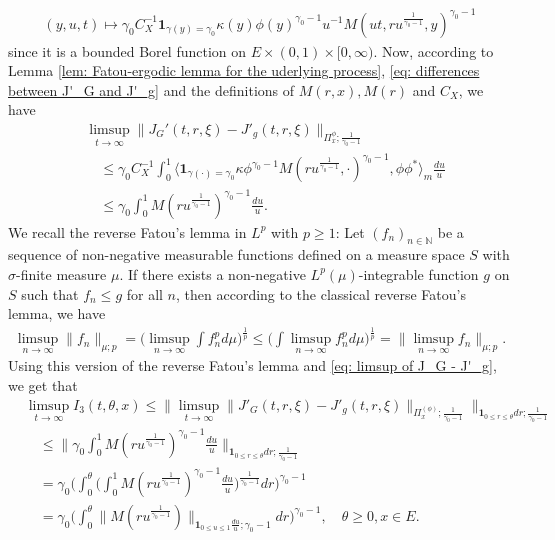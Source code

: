 \documentclass[12pt,a4paper]{amsart}
\theoremstyle{definition}
\numberwithin{equation}{section}
\begin{document}
\begin{align}
	(y,u,t)
	\mapsto \gamma_0 C_X^{-1}\mathbf 1_{\gamma(y) = \gamma_0} \kappa(y)  \phi(y)^{\gamma_0 - 1}  u^{-1} M(ut,ru^{\frac{1}{\gamma_0 - 1}},y)^{\gamma_0 - 1}
\end{align}
since it is a bounded Borel function on $E\times (0,1) \times [0,\infty)$.
Now, according to Lemma \ref{lem: Fatou-ergodic lemma for the uderlying process}, \eqref{eq: differences between J'_G and J'_g} and the definitions of $M(r,x), M(r)$ and $C_X$, we have
\begin{align}\label{eq: limsup of J_G - J'_g}
	&\limsup_{t\to \infty} \| J_G'(t,r,\xi) - J'_g(t,r,\xi) \|_{\Pi_x^{\phi};\frac{1}{\gamma_0 - 1}}
	\\& \quad \leq  \gamma_0 C_X^{-1} \int_0^1 \big\langle \mathbf 1_{\gamma(\cdot) = \gamma_0} \kappa \phi^{\gamma_0 - 1} M(ru^{\frac{1}{\gamma_0 - 1}},\cdot)^{\gamma_0 - 1}, \phi\phi^* \big\rangle_m \frac{du}{u}
	\\& \quad \leq  \gamma_0  \int_0^1  M(ru^{\frac{1}{\gamma_0 - 1}})^{\gamma_0 - 1} \frac{du}{u}.
\end{align}
We recall the reverse Fatou's lemma in $L^p$ with $p\geq 1$: Let $(f_n)_{n\in \mathbb N}$ be a sequence of non-negative measurable functions defined on a measure space $S$ with $\sigma$-finite measure $\mu$. If there exists a non-negative $L^p(\mu)$-integrable function $g$ on $S$ such that $f_n \leq g$ for all $n$, then according to the classical reverse Fatou's lemma, we have
\begin{align}
	\limsup_{n\to \infty}\big\| f_n \big\|_{\mu;p}
	= \Big (   \limsup_{n\to \infty}  \int f^p_n d\mu        \Big)^{\frac{1}{p}}
	\leq  \Big (   \int \limsup_{n\to \infty} f^p_n d\mu        \Big)^{\frac{1}{p}}
	= \big\| \limsup_{n\to \infty} f_n \big\|_{\mu;p}.
\end{align}
Using this version of the reverse Fatou's lemma and \eqref{eq: limsup of J_G - J'_g}, we get that
\begin{align}
	&\limsup_{t\to \infty} I_3(t,\theta, x)
   \leq \big\| \limsup_{t\to \infty} \|    J'_G(t,r,\xi) - J'_g(t,r,\xi) \|_{\Pi_x^{(\phi)};\frac{1}{\gamma_0 - 1}} \big\|_{\mathbf 1_{0\leq r\leq \theta} dr;\frac{1}{\gamma_0 - 1}}
	\\&\quad\leq \Big\| \gamma_0  \int_0^1  M(ru^{\frac{1}{\gamma_0 - 1}})^{\gamma_0 - 1} \frac{du}{u} \Big\|_{\mathbf 1_{0\leq r\leq \theta} dr;\frac{1}{\gamma_0 - 1}}
	\\&\quad = \gamma_0 \bigg( \int_0^\theta \Big (   \int_0^1  M(ru^{\frac{1}{\gamma_0 - 1}})^{\gamma_0 - 1} \frac{du}{u}   \Big )^{\frac{1}{\gamma_0 - 1}} dr \bigg)^{\gamma_0 - 1}
	\\&\quad = \gamma_0 \Big(  \int_0^\theta  \| M(r u^{\frac{1}{\gamma_0 - 1}}) \|_{\mathbf 1_{0\leq u\leq 1}\frac{du}{u};\gamma_0 - 1}  dr\Big)^{\gamma_0 - 1},
	\quad \theta \geq 0, x\in E.
\end{align}
	
\end{document}
